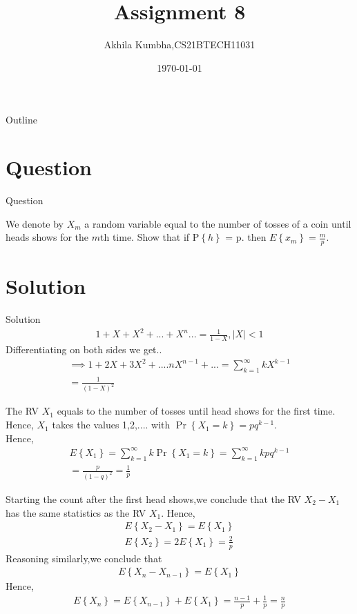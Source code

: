 \documentclass{beamer}
\title{Assignment 8}
\author{Akhila Kumbha,CS21BTECH11031}
\date{\today}
\providecommand{\brak}[1]{\ensuremath{\left(#1\right)}}
\providecommand{\cbrak}[1]{\ensuremath{\left\{#1\right\}}}
\providecommand{\pd}[1]{\ensuremath{\Pr\left\{#1\right\}}}
\begin{document}
\begin{frame}
    \titlepage 
\end{frame}

\logo{}

\begin{frame}{Outline}
    \tableofcontents
\end{frame}


\section{Question}
\begin{frame}{Question}

We denote by $X_m$ a random variable equal to the number of tosses of a coin until heads shows 
for the $m$th time. Show that if P\cbrak{h} = p. then $E\cbrak{x_m}=\frac{m}{p}$. \\ 

\end{frame}


\section{Solution}
\begin{frame}{Solution}
\begin{align}
    1+X+X^2+...+X^n...=\frac{1}{1-X} ,|X| < 1
\end{align}
Differentiating on both sides we get..
\begin{align}
    \implies 1+2X+3X^2+....nX^{n-1}+...=\sum_{k=1}^\infty kX^{k-1}\\=\frac{1}{\brak{1-X}^2}
\end{align}
\end{frame} 

\begin{frame}
 The RV $X_1$ equals to the number of tosses until head shows for the first time.\\Hence, $X_1$ takes the values 1,2,.... with  $\pd{X_1=k}=pq^{k-1}$. \\Hence,
\begin{align}
    E\cbrak{X_1}=\sum_{k=1}^\infty k\pd{X_1= k}=\sum_{k=1}^\infty kpq^{k-1}\\
    =\frac{p}{(1-q)^2}=\frac{1}{p}
\end{align}
\end{frame}
\begin{frame}
Starting the count after the first head shows,we conclude that the RV $X_2-X_1$ has the same statistics as the RV $X_1$. Hence, 
\begin{align}
   E\cbrak{X_2-X_1}=E\cbrak{X_1}\\
   E\cbrak{X_2}=2E\cbrak{X_1}=\frac{2}{p}
\end{align}
Reasoning similarly,we conclude that 
\begin{align}
    E\cbrak{X_n-X_{n-1}}=E\cbrak{X_1}
\end{align}
Hence,
\begin{align}
    E\cbrak{X_n}=E\cbrak{X_{n-1}}+E\cbrak{X_1}=\frac{n-1}{p}+\frac{1}{p}=\frac{n}{p}
\end{align}
\end{frame}
\end{document}
